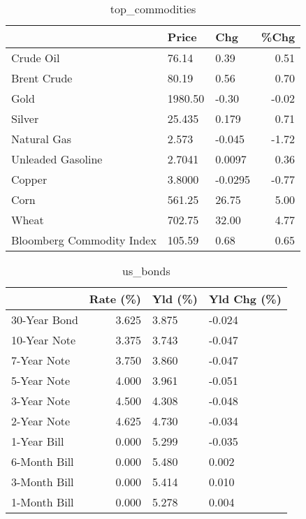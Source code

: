 \documentclass{article}%
\begin{document}
\begin{table}[htbp]%
\caption{top\_commodities}%
\centering%
\begin{adjustbox}{width=1\textwidth}%
\begin{tabular}{lllr}
\toprule
                          &   Price &     Chg &  \%Chg \\
\midrule
               Crude Oil  &   76.14 &    0.39 &  0.51 \\
             Brent Crude  &   80.19 &    0.56 &  0.70 \\
                    Gold  & 1980.50 &   -0.30 & -0.02 \\
                  Silver  &  25.435 &   0.179 &  0.71 \\
             Natural Gas  &   2.573 &  -0.045 & -1.72 \\
       Unleaded Gasoline  &  2.7041 &  0.0097 &  0.36 \\
                  Copper  &  3.8000 & -0.0295 & -0.77 \\
                    Corn  &  561.25 &   26.75 &  5.00 \\
                   Wheat  &  702.75 &   32.00 &  4.77 \\
Bloomberg Commodity Index &  105.59 &    0.68 &  0.65 \\
\bottomrule
\end{tabular}
%
\end{adjustbox}%
\end{table}

%


\begin{table}[htbp]%
\caption{us\_bonds}%
\centering%
\begin{adjustbox}{width=1\textwidth}%
\begin{tabular}{lrll}
\toprule
             &  Rate (\%) & Yld (\%) & Yld Chg (\%) \\
\midrule
30-Year Bond &     3.625 &   3.875 &      -0.024 \\
10-Year Note &     3.375 &   3.743 &      -0.047 \\
 7-Year Note &     3.750 &   3.860 &      -0.047 \\
 5-Year Note &     4.000 &   3.961 &      -0.051 \\
 3-Year Note &     4.500 &   4.308 &      -0.048 \\
 2-Year Note &     4.625 &   4.730 &      -0.034 \\
 1-Year Bill &     0.000 &   5.299 &      -0.035 \\
6-Month Bill &     0.000 &   5.480 &       0.002 \\
3-Month Bill &     0.000 &   5.414 &       0.010 \\
1-Month Bill &     0.000 &   5.278 &       0.004 \\
\bottomrule
\end{tabular}
%
\end{adjustbox}%
\end{table}
\end{document}
